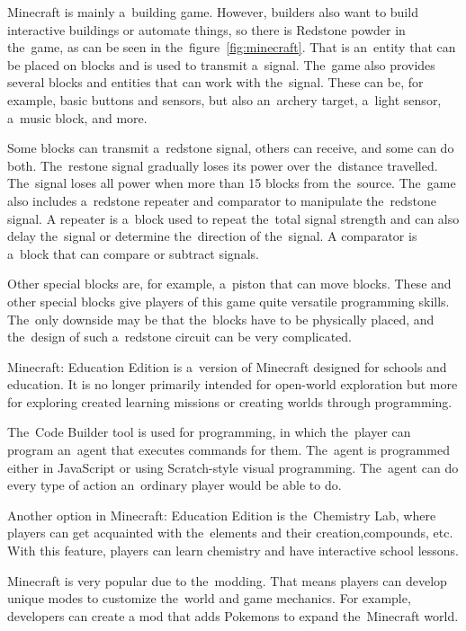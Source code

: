 Minecraft is mainly a~building game.
However, builders also want to build interactive buildings or automate things, so there is Redstone powder in the~game, as can be seen in the~figure~\ref{fig:minecraft}.
That is an~entity that can be placed on blocks and is used to transmit a~signal.
The~game also provides several blocks and entities that can work with the~signal.
These can be, for example, basic buttons and sensors, but also an~archery target, a~light sensor, a~music block, and more.

Some blocks can transmit a~redstone signal, others can receive, and some can do both.
The~restone signal gradually loses its power over the~distance travelled.
The~signal loses all power when more than 15 blocks from the~source.
The~game also includes a~redstone repeater and comparator to manipulate the~redstone signal.
A repeater is a~block used to repeat the~total signal strength and can also delay the~signal or determine the~direction of the~signal.
A comparator is a~block that can compare or subtract signals.

\pagebreak
Other special blocks are, for example, a~piston that can move blocks.
These and other special blocks give players of this game quite versatile programming skills.
The~only downside may be that the~blocks have to be physically placed, and the~design of such a~redstone circuit can be very complicated.

Minecraft: Education Edition is a~version of Minecraft designed for schools and education.
It is no longer primarily intended for open-world exploration but more for exploring created learning missions or creating worlds through programming.

The~Code Builder tool is used for programming, in which the~player can program an~agent that executes commands for them.
The~agent is programmed either in JavaScript or using Scratch-style visual programming.
The~agent can do every type of action an~ordinary player would be able to do.

Another option in Minecraft: Education Edition is the~Chemistry Lab, where players can get acquainted with the~elements and their creation,\linebreak{}compounds, etc.
With this feature, players can learn chemistry and have interactive school lessons.

Minecraft is very popular due to the~modding.
That means players can develop unique modes to customize the~world and game mechanics.
For example, developers can create a mod that adds Pokemons to expand the~Minecraft world.

